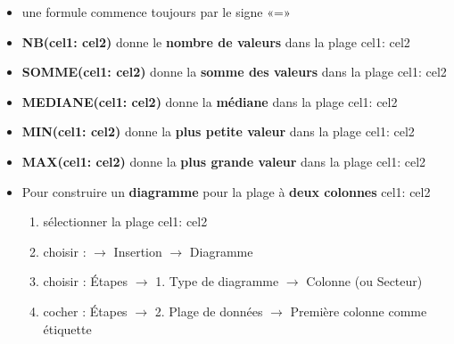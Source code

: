 \def\authors{PESIN - CADOT - COURTIN}
\def\theme{\large Formulaire tableur : Statistiques}
\def\imgPath{libre-office/}
\thispagestyle{small}
\def\cu{cel1}
\def\cd{cel2}
\vspace*{-1cm}
\begin{itemize}
    \item une formule commence toujours par le signe «=»
    \item \textbf{NB(\cu : \cd)} donne le \textbf{nombre de valeurs} dans la plage \cu : \cd
    \item \textbf{SOMME(\cu : \cd)} donne la \textbf{somme des valeurs} dans la plage \cu : \cd
    \item \textbf{MEDIANE(\cu  : \cd)} donne la \textbf{médiane} dans la plage \cu : \cd
    \item \textbf{MIN(\cu : \cd)} donne la \textbf{plus petite valeur} dans la plage \cu : \cd
    \item \textbf{MAX(\cu : \cd)} donne la \textbf{plus grande valeur} dans la plage \cu : \cd
    \item Pour construire un \textbf{diagramme} pour la plage à \textbf{deux colonnes} \cu : \cd
    \begin{enumerate}
        \item sélectionner la plage \cu : \cd
        \item choisir : $\rightarrow$ Insertion $\rightarrow$  Diagramme
        \item choisir : Étapes $\rightarrow$ 1. Type de diagramme  $\rightarrow$  Colonne (ou  Secteur)
        \item cocher : Étapes $\rightarrow$ 2. Plage de données $\rightarrow$ Première colonne comme étiquette
    \end{enumerate}
\end{itemize}